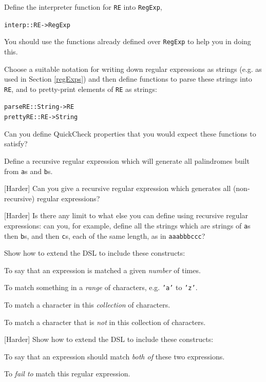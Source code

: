 \begin{exercises}

\item
Define the interpreter function
for \texttt{RE} into \texttt{RegExp},
\begin{alltt}
interp :: RE -> RegExp
\end{alltt}
You should use the functions already defined over \texttt{RegExp} to help you in doing this.

\item
Choose a suitable notation for writing down regular expressions as strings (e.g. as used in Section \ref{regExps}) and then define functions to parse these strings into \texttt{RE}, and to pretty-print elements of \texttt{RE} as strings:
\begin{alltt}
parseRE  :: String -> RE
prettyRE :: RE -> String
\end{alltt}
Can you define QuickCheck properties that you would expect these functions to satisfy?

\item
Define a recursive regular expression which will generate all palindromes built from \texttt{a}s and \texttt{b}s. 

\item{[Harder]}
Can you give a recursive regular expression which generates all (non-recursive) regular expressions?

\item{[Harder]}
Is there any limit to what else you can define using recursive regular expressions: can you, for example, define all the strings which are strings of \texttt{a}s then \texttt{b}s, and then \texttt{c}s, each of the same length, as in \texttt{aaabbbccc}?



\item
Show how to extend the DSL to include these constructs:
\begin{titemize}
\item
To say that an expression is matched a given \emph{number} of times.
\item
To match something in a \emph{range} of characters, e.g. \texttt{'a'} to \texttt{'z'}.
\item
To match a character in this \emph{collection} of characters.
\item
To match a character that is \emph{not} in this collection of characters.
\end{titemize}

\item{[Harder]}
Show how to extend the DSL to include these constructs:
\begin{titemize}
\item
To say that an expression should match \emph{both of} these two expressions.
\item
To \emph{fail to} match this regular expression.
\end{titemize}

\end{exercises}

